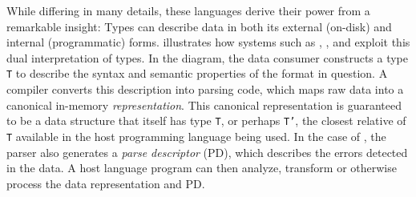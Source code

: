 


While differing in many details, 
these languages derive their power from 
a remarkable insight: 
Types can describe data in both its external (on-disk) and internal
(programmatic) forms.
 illustrates how systems such as
\pads{}, \datascript{}, and \packettypes{} exploit this
dual interpretation of types.  In the diagram,
the data consumer constructs a type {\tt T}
to describe the syntax and semantic properties of the format 
in question.  A compiler converts this
description into parsing code, which maps raw data into a canonical
in-memory {\em representation}.  
This canonical representation is guaranteed to be a data structure
that itself has type {\tt T}, or perhaps {\tt T'}, the closest relative of
{\tt T} available in the host programming language
being used.
In the case of \pads{}, the parser also generates a {\em parse 
descriptor} (PD), which
describes the errors detected in the data.  
A host language program can then analyze, transform or
otherwise process the data representation and PD. 

